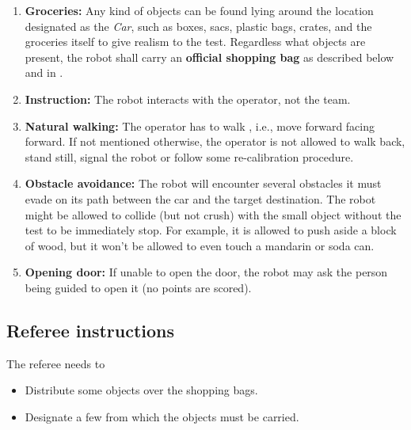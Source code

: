 \begin{enumerate}
  \item \textbf{Groceries:} Any kind of objects can be found lying around the location designated as the \textit{Car}, such as boxes, sacs, plastic bags, crates, and the groceries itself to give realism to the test. Regardless what objects are present, the robot shall carry an \textbf{official shopping bag} as described below and in .

  \item \textbf{Instruction:} The robot interacts with the operator, not the team.

  \item \textbf{Natural walking:} The operator has to walk , i.e., move forward facing forward. If not mentioned otherwise, the operator is not allowed to walk back, stand still, signal the robot or follow some re-calibration procedure.

  \item \textbf{Obstacle avoidance:} The robot will encounter several obstacles it must evade on its path between the car and the target destination.
  The robot might be allowed to collide (but not crush) with the small object without the test to be immediately stop. For example, it is allowed to push aside a block of wood, but it won't be allowed to even touch a mandarin or soda can.

  \item \textbf{Opening door:} If unable to open the door, the robot may ask the person being guided to open it (no points are scored).

\end{enumerate}


\subsection{Referee instructions}

The referee needs to
\begin{itemize}
  \item Distribute some objects over the shopping bags.
  \item Designate a few  from which the objects must be carried.
\end{itemize}

